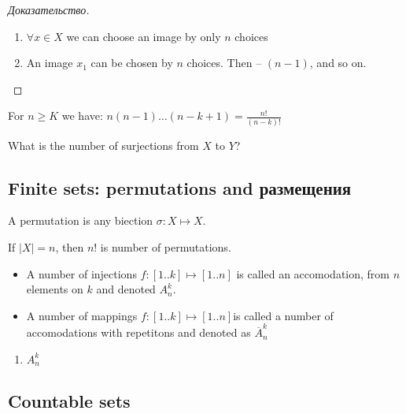\begin{proof}[Доказательство]
	\begin{enumerate}
		\item $\forall x \in X$ we can choose an image by only $n$ choices
		\item An image $x_1$ can be chosen by $n$ choices. Then -- $(n-1)$, and so on.
	\end{enumerate}
\end{proof}

\begin{note}[]
	For $n \geq K$ we have: $n(n-1) \dots (n-k+1) = \frac{n!}{(n-k)!}$
\end{note}

\begin{exercise}
	What is the number of surjections from $X$ to $Y$?
\end{exercise}

\subsection{Finite sets: permutations and размещения}

\begin{definition}[Permutation]
	A permutation is any biection $\sigma: X \mapsto X$.
\end{definition}

\begin{corollary}[]
	If $|X| = n$, then  $n!$ is number of permutations.
\end{corollary}

\begin{definition}[]
	\begin{itemize}
		\item A number of injections $f: [1..k] \mapsto [1..n]$ is called an accomodation, from $n$ elements on  $ k$ and denoted $A^{k}_{n}$.
		\item A number of mappings $f: [1..k] \mapsto [1..n]$is called a number of accomodations with repetitons and denoted as $\overline{A}_n^{k}$
	\end{itemize}
\end{definition}

\begin{enumerate}
	\item $A_n^{k}$
\end{enumerate}

\subsection{Countable sets}

